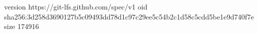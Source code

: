 version https://git-lfs.github.com/spec/v1
oid sha256:3d258d3690127b5c09493dd78d1c97c29ee5c54b2c1d58c5cdd5be1e9d740f7e
size 174916
